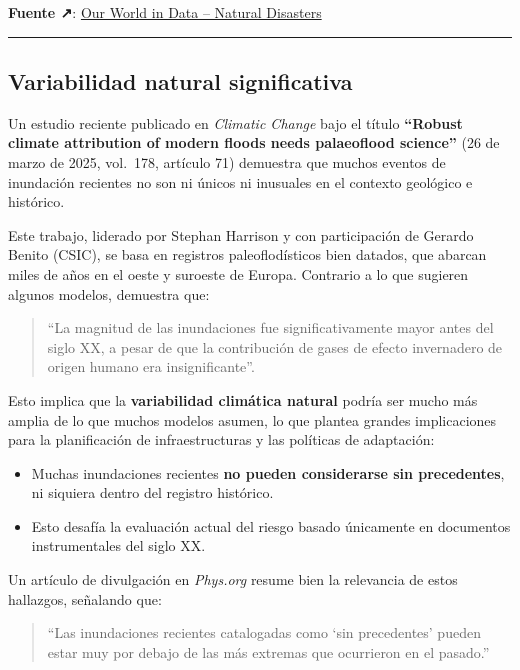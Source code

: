 \documentclass[
  10pt,
  a4paper,
  DIV=11,
  numbers=noendperiod,
  open=any]{scrreprt}
\providecommand{\tightlist}{%
  \setlength{\itemsep}{0pt}\setlength{\parskip}{0pt}}
\numberwithin{equation}{chapter}
\numberwithin{equation}{chapter}
\renewcommand{\[}{\begin{equation}}
\renewcommand{\]}{\end{equation}}
\begin{document}
\textbf{Fuente ↗}:
\href{https://ourworldindata.org/natural-disasters}{Our World in Data --
Natural Disasters}

\begin{center}\rule{0.5\linewidth}{0.5pt}\end{center}

\subsection{Variabilidad natural
significativa}\label{variabilidad-natural-significativa}

Un estudio reciente publicado en \emph{Climatic Change} bajo el título
\textbf{``Robust climate attribution of modern floods needs palaeoflood
science''} (26 de marzo de 2025, vol.~178, artículo 71) demuestra que
muchos eventos de inundación recientes no son ni únicos ni inusuales en
el contexto geológico e histórico.

Este trabajo, liderado por Stephan Harrison y con participación de
Gerardo Benito (CSIC), se basa en registros paleoflodísticos bien
datados, que abarcan miles de años en el oeste y suroeste de Europa.
Contrario a lo que sugieren algunos modelos, demuestra que:

\begin{quote}
``La magnitud de las inundaciones fue significativamente mayor antes del
siglo XX, a pesar de que la contribución de gases de efecto invernadero
de origen humano era insignificante''.
\end{quote}

Esto implica que la \textbf{variabilidad climática natural} podría ser
mucho más amplia de lo que muchos modelos asumen, lo que plantea grandes
implicaciones para la planificación de infraestructuras y las políticas
de adaptación:

\begin{itemize}
\tightlist
\item
  Muchas inundaciones recientes \textbf{no pueden considerarse sin
  precedentes}, ni siquiera dentro del registro histórico.
\item
  Esto desafía la evaluación actual del riesgo basado únicamente en
  documentos instrumentales del siglo XX.
\end{itemize}

Un artículo de divulgación en \emph{Phys.org} resume bien la relevancia
de estos hallazgos, señalando que:

\begin{quote}
``Las inundaciones recientes catalogadas como `sin precedentes' pueden
estar muy por debajo de las más extremas que ocurrieron en el pasado.''
\end{quote}
\end{document}
